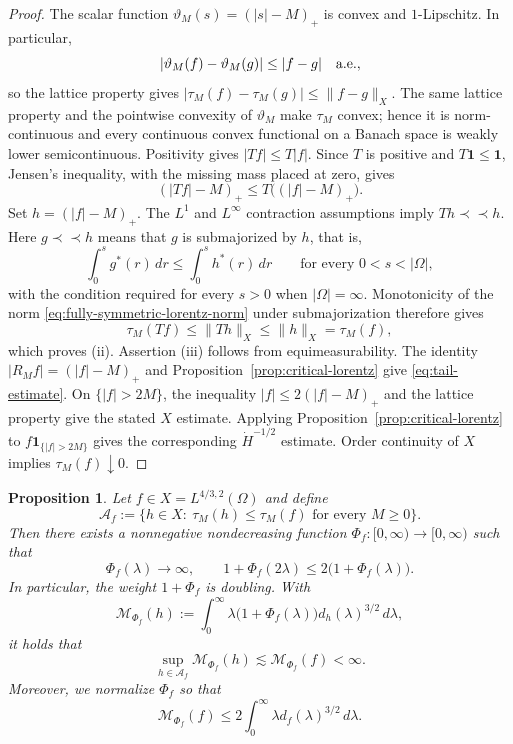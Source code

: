 \documentclass[11pt,reqno]{amsproc}
\newtheorem{proposition}{Proposition}[section]
\newcommand{\Om}{\Omega}
\newcommand{\one}{\mathbf 1}
\newcommand{\dd}{\,d}
\begin{document}
\begin{proof}
The scalar function $\vartheta_M(s)=(|s|-M)_+$ is convex and $1$-Lipschitz.
In particular,
\[
 |\vartheta_M(f)-\vartheta_M(g)|\le |f-g|
 \quad\hbox{a.e.},
\]
so the lattice property gives
$|\tau_M(f)-\tau_M(g)|\le\|f-g\|_X$.  The same lattice property and the
pointwise convexity of $\vartheta_M$ make $\tau_M$ convex; hence it is
norm-continuous and
every continuous convex functional on a Banach space is weakly lower
semicontinuous.  Positivity gives $|Tf|\le T|f|$.  Since $T$ is positive and
$T\one\leq\one$, Jensen's inequality, with the missing mass placed at zero,
gives
\[
 (|Tf|-M)_+\le T\bigl((|f|-M)_+\bigr).
\]
Set $h=(|f|-M)_+$.  The $L^1$ and $L^\infty$ contraction assumptions imply
$Th\prec\!\prec h$.  Here $g\prec\!\prec h$ means that $g$ is
submajorized by $h$, that is,
\[
  \int_0^s g^*(r)\dd r
  \leq
  \int_0^s h^*(r)\dd r
  \qquad\text{for every }0<s<|\Om|,
\]
with the condition required for every $s>0$ when $|\Om|=\infty$.
Monotonicity of the norm
\eqref{eq:fully-symmetric-lorentz-norm} under submajorization therefore gives
\[
 \tau_M(Tf)\leq\|Th\|_X\leq\|h\|_X=\tau_M(f),
\]
which proves (ii).  Assertion (iii)
follows from equimeasurability.  The identity $|R_Mf|=(|f|-M)_+$ and
Proposition~\ref{prop:critical-lorentz} give \eqref{eq:tail-estimate}.  On
$\{|f|>2M\}$, the inequality $|f|\le2(|f|-M)_+$ and the lattice property
give the stated $X$ estimate.  Applying Proposition~\ref{prop:critical-lorentz}
to $f\one_{\{|f|>2M\}}$ gives the corresponding
$\dot H^{-1/2}$ estimate.
Order continuity of $X$ implies $\tau_M(f)\downarrow0$.
\end{proof}





\begin{proposition}
\label{prop:weighted-tail-envelope}
Let $f\in X=L^{4/3,2}(\Om)$ and define
\[
  \mathcal A_f
  :=\{h\in X:\ \tau_M(h)\le\tau_M(f)
       \text{ for every }M\ge0\}.
\]
Then there exists a nonnegative nondecreasing function
$\Phi_f:[0,\infty)\to[0,\infty)$ such that
\[
  \Phi_f(\lambda)\longrightarrow\infty,
  \qquad
  1+\Phi_f(2\lambda)
  \le2\bigl(1+\Phi_f(\lambda)\bigr).
\]
In particular, the weight $1+\Phi_f$ is doubling.  With
\[
  \mathcal M_{\Phi_f}(h)
  :=\int_0^\infty
  \lambda\bigl(1+\Phi_f(\lambda)\bigr)
  d_h(\lambda)^{3/2}\dd\lambda,
\]
it holds that
\begin{equation}\label{eq:weighted-tail-envelope}
  \sup_{h\in\mathcal A_f}\mathcal M_{\Phi_f}(h)
  \lesssim \mathcal M_{\Phi_f}(f)<\infty.
\end{equation}
Moreover, we normalize $\Phi_f$  so that
\begin{equation}\label{eq:weighted-tail-normalization}
  \mathcal M_{\Phi_f}(f)
  \le2\int_0^\infty \lambda d_f(\lambda)^{3/2}\dd\lambda.
\end{equation}
\end{proposition}
\end{document}
